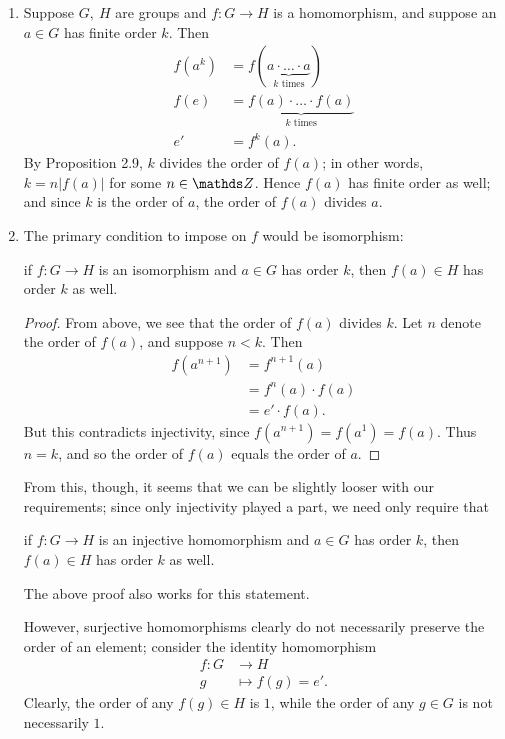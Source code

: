 \documentclass{homework}
\begin{document}
\begin{solution}
  \begin{enumerate}[label=(\alph*)]
    \item Suppose $G,\ H$ are groups and $f:G\to H$ is a homomorphism, and suppose an $a\in G$ has
      finite order $k$. Then
      \begin{align*}
        f(a^{k})&=f(\underbrace{a\cdot \ldots\cdot a}_\text{$k$ times})\\
        f(e)   &= \underbrace{f(a)\cdot \ldots\cdot f(a)}_\text{$k$ times} \\
          e'   &= f^k(a)
      .\end{align*}
      By Proposition 2.9, $k$ divides the order of $f(a)$; in other words, $k=n\left| f(a) \right| $ 
      for some $n\in \Z$. Hence $f(a)$ has finite order as well; and since $k$ is the order of $a$,
      the order of $f(a)$ divides $a$.

    \item The primary condition to impose on $f$ would be isomorphism:
      \begin{center}
        if $f:G\to H$ is an isomorphism and $a\in G$ has order $k$, then $f(a)\in H$ has order $k$
        as well.
      \end{center}
      \begin{proof}[Proof]
        From above, we see that the order of $f(a)$ divides $k$. Let $n$ denote the order of $f(a)$,
        and suppose $n<k$. Then
        \begin{align*}
          f(a^{n+1})&= f^{n+1}(a)\\
                    &= f^{n}(a)\cdot f(a) \\
                    &= e'\cdot f(a)
        .\end{align*}
        But this contradicts injectivity, since $f(a^{n+1})=f(a^{1})=f(a)$. Thus $n=k$, and so the
        order of $f(a)$ equals the order of $a$.
      \end{proof}
      From this, though, it seems that we can be slightly looser with our requirements; since only
      injectivity played a part, we need only require that \begin{center}
        if $f:G\to H$ is an injective homomorphism and $a\in G$ has order $k$, then $f(a)\in H$ has
        order $k$ as well.
      \end{center} The above proof also works for this statement.

      However, surjective homomorphisms clearly do not necessarily preserve the order of an element;
      consider the identity homomorphism \begin{align*}
        f: G &\longrightarrow H \\
        g &\longmapsto f(g) = e'
      .\end{align*} Clearly, the order of any $f(g)\in H$ is $1$, while the order of any $g\in G$ is
      not necessarily $1$.
  \end{enumerate}
\end{solution}
\end{document}

